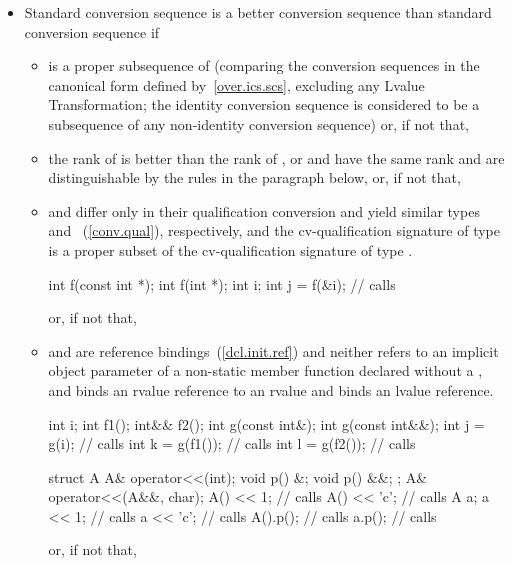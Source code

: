 \begin{itemize}
\item
Standard conversion sequence
is a better conversion
sequence than standard conversion sequence
if

\begin{itemize}
\item
{}%
is a proper subsequence of
(comparing the conversion sequences in the canonical form defined
by~\ref{over.ics.scs}, excluding any Lvalue Transformation;
the identity conversion sequence is considered to be a
subsequence of any non-identity conversion sequence)
or, if not that,
\item
the rank of
is better than the rank of
,
or
and
have the same rank and are distinguishable by the rules
in the paragraph below,
or, if not that,
\item
{}
and
differ only in their qualification conversion and yield similar types
and
~(\ref{conv.qual}), respectively, and the cv-qualification signature of type
is a proper subset of the cv-qualification signature of type
.
\enterexample

\begin{codeblock}
int f(const int *);
int f(int *);
int i;
int j = f(&i);                  // calls 
\end{codeblock}
\exitexample
or, if not that,

\item {} and  are reference bindings~(\ref{dcl.init.ref}) and
neither refers to an implicit object parameter of a non-static member function
declared without a ,
and  binds an rvalue reference to an
rvalue and  binds an lvalue reference.

\enterexample
\begin{codeblock}
int i;
int f1();
int&& f2();
int g(const int&);
int g(const int&&);
int j = g(i);                   // calls 
int k = g(f1());                // calls 
int l = g(f2());                // calls 

struct A {
  A& operator<<(int);
  void p() &;
  void p() &&;
};
A& operator<<(A&&, char);
A() << 1;                       // calls 
A() << 'c';                     // calls 
A a;
a << 1;                         // calls 
a << 'c';                       // calls 
A().p();                        // calls 
a.p();                          // calls 
\end{codeblock}
\exitexample
or, if not that,


\end{itemize}
\end{itemize}
